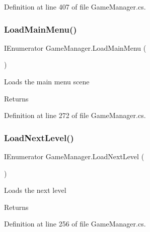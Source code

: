 Definition at line 407 of file Game\+Manager.\+cs.

\mbox{\label{class_game_manager_a5c23fa91837ebfc3f114e315ee4a0623}} 
\subsubsection{\texorpdfstring{Load\+Main\+Menu()}{LoadMainMenu()}}
{\footnotesize\ttfamily I\+Enumerator Game\+Manager.\+Load\+Main\+Menu (\begin{DoxyParamCaption}{ }\end{DoxyParamCaption})\hspace{0.3cm}{\ttfamily [private]}}



Loads the main menu scene 

\begin{DoxyReturn}{Returns}

\end{DoxyReturn}


Definition at line 272 of file Game\+Manager.\+cs.

\mbox{\label{class_game_manager_a5b92f7fbdd78acc3576b9f8fa83a7f6b}} 
\subsubsection{\texorpdfstring{Load\+Next\+Level()}{LoadNextLevel()}}
{\footnotesize\ttfamily I\+Enumerator Game\+Manager.\+Load\+Next\+Level (\begin{DoxyParamCaption}{ }\end{DoxyParamCaption})\hspace{0.3cm}{\ttfamily [private]}}



Loads the next level 

\begin{DoxyReturn}{Returns}

\end{DoxyReturn}


Definition at line 256 of file Game\+Manager.\+cs.

\mbox{\label{class_game_manager_a4d01c563f63394c879c458b8449967a0}} 
